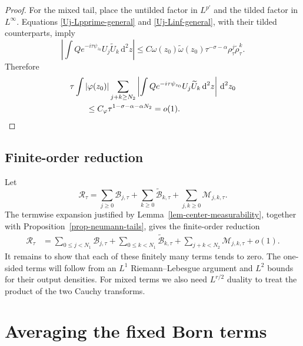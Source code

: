 \documentclass[a4paper,11pt]{article}
\newcommand{\dd}{\,\text{d}}
\theoremstyle{plain}
\theoremstyle{definition}
\theoremstyle{remark}
\begin{document}
\begin{proof}
For the mixed tail, place the untilded factor in $L^{p'}$ and the tilded factor in $L^\infty$.  Equations \eqref{Uj-Lpprime-general} and \eqref{Uj-Linf-general}, with their tilded counterparts, imply
\begin{equation}\label{termwise-mixed-tail-bound}
 \left|\int Qe^{-i\tau\psi_{z_0}}U_j\widetilde U_k\dd^2z\right|
 \leq
 C\omega(z_0)\widetilde\omega(z_0)
 \tau^{-\sigma-\alpha}\rho_\tau^j\widetilde\rho_\tau^k.
\end{equation}
Therefore
\begin{align}
 &\tau\int |\varphi(z_0)|
 \sum_{j+k\geq N_2}
 \left|\int Qe^{-i\tau\psi_{z_0}}U_j\widetilde U_k\dd^2z\right|
 \dd^2z_0
 \notag\\
 &\qquad\leq C_\varphi\tau^{1-\sigma-\alpha-\alpha N_2}=o(1).
 \label{mixed-tail-decay}
\end{align}
\end{proof}


\subsection{Finite-order reduction}

Let
\begin{equation}\label{remainder-functional-as-born-sums}
 \mathcal R_\tau
 =\sum_{j\geq0}\mathcal B_{j,\tau}
  +\sum_{k\geq0}\widetilde{\mathcal B}_{k,\tau}
  +\sum_{j,k\geq0}\mathcal M_{j,k,\tau}.
\end{equation}
The termwise expansion justified by Lemma~\ref{lem-center-measurability}, together with Proposition~\ref{prop-neumann-tails}, gives the finite-order reduction
\begin{align}
 \mathcal R_\tau
 &={}
 \sum_{0\leq j<N_1}\mathcal B_{j,\tau}
 +\sum_{0\leq k<N_1}\widetilde{\mathcal B}_{k,\tau}
 +\sum_{j+k<N_2}\mathcal M_{j,k,\tau}
 +o(1).
 \label{finite-tail-born-split}
\end{align}
It remains to show that each of these finitely many terms tends to zero.  The one-sided terms will follow from an $L^1$ Riemann--Lebesgue argument and $L^2$ bounds for their output densities.  For mixed terms we also need $L^{r/2}$ duality to treat the product of the two Cauchy transforms.


\section{Averaging the fixed Born terms}\label{sec:fixed-born-orders}\label{subsec-signed-output-estimates}
\end{document}
